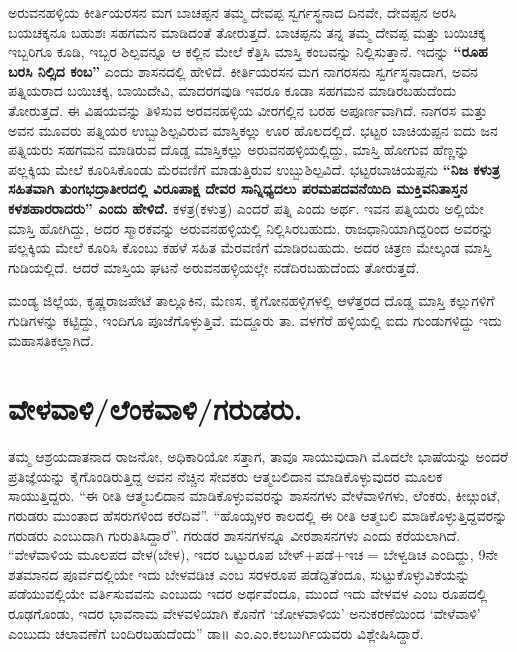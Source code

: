 ಅರುವನಹಳ್ಳಿಯ ಕೀರ್ತಿಯರಸನ ಮಗ ಬಾಚಪ್ಪನ ತಮ್ಮ ದೇವಪ್ಪ ಸ್ವರ್ಗಸ್ಥನಾದ ದಿನವೇ, ದೇವಪ್ಪನ ಅರಸಿ ಬಯಚಕ್ಕನೂ ಬಹುಶಃ ಸಹಗಮನ ಮಾಡಿದಂತೆ ತೋರುತ್ತದೆ. ಬಾಚಪ್ಪನು ತನ್ನ ತಮ್ಮ ದೇವಪ್ಪ ಮತ್ತು ಬಯಿಚಕ್ಕ ಇಬ್ಬರಿಗೂ ಕೂಡಿ, ಇಬ್ಬರ ಶಿಲ್ಪವನ್ನೂ ಆ ಕಲ್ಲಿನ ಮೇಲೆ ಕೆತ್ತಿಸಿ ಮಾಸ್ತಿ ಕಂಬವನ್ನು ನಿಲ್ಲಿಸುತ್ತಾನೆ. ಇದನ್ನು \textbf{“ರೂಹ ಬರಸಿ ನಿಲ್ಸಿದ ಕಂಬ”} ಎಂದು ಶಾಸನದಲ್ಲಿ ಹೇಳಿದೆ. ಕೀರ್ತಿಯರಸನ ಮಗ ನಾಗರಸನು ಸ್ವರ್ಗಸ್ಥನಾದಾಗ, ಅವನ ಪತ್ನಿಯರಾದ ಬಯಿಚಕ್ಕ, ಬಾಯಿದೇವಿ, ಮಾದರಗವುಡಿ ಇವರೂ ಕೂಡಾ ಸಹಗಮನ ಮಾಡಿರಬಹುದೆಂದು ತೋರುತ್ತದೆ. ಈ ವಿಷಯವನ್ನು ತಿಳಿಸುವ ಅರವನಹಳ್ಳಿಯ ವೀರಗಲ್ಲಿನ ಬರಹ ಅಪೂರ್ಣವಾಗಿದೆ. ನಾಗರಸ ಮತ್ತು ಅವನ ಮೂವರು ಪತ್ನಿಯರ ಉಬ್ಬುಶಿಲ್ಪವಿರುವ ಮಾಸ್ತಿಕಲ್ಲು ಊರ ಹೊಲದಲ್ಲಿದೆ. ಭಟ್ಟರ ಬಾಚಿಯಪ್ಪನ ಐದು ಜನ ಪತ್ನಿಯರು ಸಹಗಮನ ಮಾಡಿರುವ ದೊಡ್ಡ ಮಾಸ್ತಿಕಲ್ಲು ಅರುವನಹಳ್ಳಿಯಲ್ಲಿದ್ದು, ಮಾಸ್ತಿ ಹೋಗುವ ಹೆಣ್ಣನ್ನು ಪಲ್ಲಕ್ಕಿಯ ಮೇಲೆ ಕೂರಿಸಿಕೊಂಡು ಮೆರವಣಿಗೆ ಮಾಡುತ್ತಿರುವ ಉಬ್ಬುಶಿಲ್ಪವಿದೆ. ಭಟ್ಟರಬಾಚಿಯಪ್ಪನು \textbf{“ನಿಜ ಕಳುತ್ರ ಸಹಿತವಾಗಿ ತುಂಗಭದ್ರಾತೀರದಲ್ಲಿ ವಿರೂಪಾಕ್ಷ ದೇವರ ಸಾನ್ನಿಧ್ಯದಲು ಪರಮಪದವನೆಯಿದಿ ಮುಕ್ತಿವನಿತಾಸ್ತನ ಕಳಶಹಾರರಾದರು” ಎಂದು ಹೇಳಿದೆ.} ಕಳತ್ರ(ಕಳುತ್ರ) ಎಂದರೆ ಪತ್ನಿ ಎಂದು ಅರ್ಥ. ಇವನ ಪತ್ನಿಯರು ಅಲ್ಲಿಯೇ ಮಾಸ್ತಿ ಹೋಗಿದ್ದು, ಅದರ ಸ್ಮಾರಕವನ್ನು ಅರುವನಹಳ್ಳಿಯಲ್ಲಿ ನಿಲ್ಲಿಸಿರಬಹುದು. ರಾಜಧಾನಿಯಾಗಿದ್ದರಿಂದ ಅವರನ್ನು ಪಲ್ಲಕ್ಕಿಯ ಮೇಲೆ ಕೂರಿಸಿ ಕೊಂಬು ಕಹಳೆ ಸಹಿತ ಮೆರವಣಿಗೆ ಮಾಡಿರಬಹುದು. ಅದರ ಚಿತ್ರಣ ಮೇಲ್ಕಂಡ ಮಾಸ್ತಿ ಗುಡಿಯಲ್ಲಿದೆ. ಆದರೆ ಮಾಸ್ತಿಯ ಘಟನೆ ಅರುವನಹಳ್ಳಿಯಲ್ಲೇ ನಡೆದಿರಬಹುದೆಂದು ತೋರುತ್ತದೆ.

ಮಂಡ್ಯ ಜಿಲ್ಲೆಯ, ಕೃಷ್ಣರಾಜಪೇಟೆ ತಾಲ್ಲೂಕಿನ, ಮೆಣಸ, ಕೈಗೋನಹಳ್ಳಿಗಳಲ್ಲಿ ಆಳೆತ್ತರದ ದೊಡ್ಡ ಮಾಸ್ತಿ ಕಲ್ಲುಗಳಿಗೆ ಗುಡಿಗಳನ್ನು ಕಟ್ಟಿದ್ದು, ಇಂದಿಗೂ ಪೂಜೆಗೊಳ್ಳುತ್ತಿವೆ. ಮದ್ದೂರು ತಾ. ವಳಗೆರೆ ಹಳ್ಳಿಯಲ್ಲಿ ಐದು ಗುಂಡುಗಳಿದ್ದು ಇದು ಮಹಾಸತಿಕಲ್ಲಾಗಿದೆ.


\section{ವೇಳವಾಳಿ/ಲೆಂಕವಾಳಿ/ಗರುಡರು.}

ತಮ್ಮ ಆಶ್ರಯದಾತನಾದ ರಾಜನೋ, ಅಧಿಕಾರಿಯೋ ಸತ್ತಾಗ, ತಾವೂ ಸಾಯುವುದಾಗಿ ಮೊದಲೇ ಭಾಷೆಯನ್ನು ಅಂದರೆ ಪ್ರತಿಜ್ಞೆಯನ್ನು ಕೈಗೊಂಡಿರುತ್ತಿದ್ದ ಅವನ ನೆಚ್ಚಿನ ಸೇವಕರು ಆತ್ಮಬಲಿದಾನ ಮಾಡಿಕೊಳ್ಳುವುದರ ಮೂಲಕ ಸಾಯುತ್ತಿದ್ದರು. “ಈ ರೀತಿ ಆತ್ಮಬಲಿದಾನ ಮಾಡಿಕೊಳ್ಳುವವರನ್ನು ಶಾಸನಗಳು ವೇಳೆವಾಳಿಗಳು, ಲೆಂಕರು, ಕೀೞ್ಗುಂಟೆ, ಗರುಡರು ಮುಂತಾದ ಹೆಸರುಗಳಿಂದ ಕರೆದಿವೆ”. “ಹೊಯ್ಸಳರ ಕಾಲದಲ್ಲಿ ಈ ರೀತಿ ಆತ್ಮಬಲಿ ಮಾಡಿಕೊಳ್ಳುತ್ತಿದ್ದವರನ್ನು ಗರುಡರು ಎಂಬುದಾಗಿ ಗುರುತಿಸಿದ್ದಾರೆ”. ಗರುಡರ ಶಾಸನಗಳನ್ನೂ ವೀರಶಾಸನಗಳು ಎಂದು ಕರೆಯಲಾಗಿದೆ. “ವೇಳೆವಾಳಿಯ ಮೂಲಪದ ವೇಳ(ಬೇಳ), ಇದರ ಒಟ್ಟುರೂಪ ಬೇಳ್​+ಪಡೆ+ಇಚ = ಬೇಳ್ವಡಿಚ ಎಂದಿದ್ದು, 9ನೇ ಶತಮಾನದ ಪೂರ್ವದಲ್ಲಿಯೇ ಇದು ಬೇಳವಡಿಚ ಎಂಬ ಸರಳರೂಪ ಪಡೆದ್ದಿತೆಂದೂ, ಸುಟ್ಟುಕೊಳ್ಳುವಿಕೆಯನ್ನು ಪಡೆಯುವಲ್ಲಿಯೇ ವರ್ತಿಸುವವನು ಎಂಬುದು ಇದರ ಅರ್ಥವೆಂದೂ, ಮುಂದೆ ಇದು ವೇಳವಳ ಎಂಬ ರೂಪದಲ್ಲಿ ರೂಢಗೊಂಡು, ಇದರ ಭಾವನಾಮ ವೇಳವಳಿಯಾಗಿ ಕೊನೆಗೆ ‘ಜೋಳವಾಳಿಯ’ ಅನುಕರಣೆಯಿಂದ ‘ವೇಳೆವಾಳಿ’ ಎಂಬುದು ಚಲಾವಣೆಗೆ ಬಂದಿರಬಹುದೆಂದು” ಡಾ॥ ಎಂ.ಎಂ.ಕಲಬುರ್ಗಿಯವರು ವಿಶ್ಲೇಷಿಸಿದ್ದಾರೆ.

